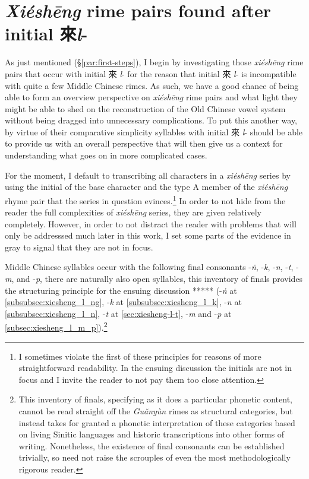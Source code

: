 \section{\textit{Xiéshēng} rime pairs found after initial 來\textit{l}-}\label{sec:Xiéshēng rime pairs found after initial 來l-}
As just mentioned (§\ref{par:first-steps}), I begin by investigating those \textit{xiéshēng} rime pairs that occur with initial 來 \textit{l}- for the reason that initial 來 \textit{l}- is incompatible with quite a few 
Middle Chinese rimes. As such, we have a good chance of being able to form an overview  
perspective on \textit{xiéshēng} rime pairs and what light they might be able to shed on the reconstruction of the Old Chinese vowel system
without being dragged into unnecessary complications. To put this another way, by virtue of their comparative simplicity syllables with initial 來 \textit{l}- should be able to provide us with an overall perspective that will then give us a context for understanding what goes on in more complicated cases. 

For the moment, I default to transcribing all characters in a \textit{xiéshēng} series by using the initial of the base character and the type A member of the \textit{xiéshēng} rhyme pair that the series in question evinces.\footnote{I sometimes violate the first of these principles for reasons of more straightforward readability. In the ensuing discussion the initials are not in focus and I invite the reader to not pay them too close attention.}  
In order to not hide from the reader the full complexities of \textit{xiéshēng} series, they are given relatively completely. 
However, in order to not distract the reader with problems that will only be addresssed much later in this work, I set some parts of the evidence in gray to signal that they are not in focus. 

Middle Chinese syllables occur with the following final consonants -\textit{ṅ}, -\textit{k}, -\textit{n}, -\textit{t}, -\textit{m}, and -\textit{p}, there are naturally also open syllables, this inventory of finals provides the structuring principle for the ensuing discussion ***** (-\textit{ṅ} at \ref{subsubsec:xiesheng_l_ng}, -\textit{k} at \ref{subsubsec:xiesheng_l_k}, -\textit{n} at \ref{subsubsec:xiesheng_l_n}, -\textit{t} at \ref{sec:xiesheng-l-t}, -\textit{m} and -\textit{p} at \ref{subsec:xiesheng_l_m_p}).\footnote{This inventory of finals, specifying as it does a particular phonetic content, cannot be read straight off the \textit{Guǎnyùn} rimes as structural categories, but instead takes for granted a phonetic interpretation of these categories based on living Sinitic languages and historic transcriptions into other forms of writing. Nonetheless, the existence of final consonants can be established trivially, so need not raise the scrouples of even the most methodologically rigorous reader.} 


